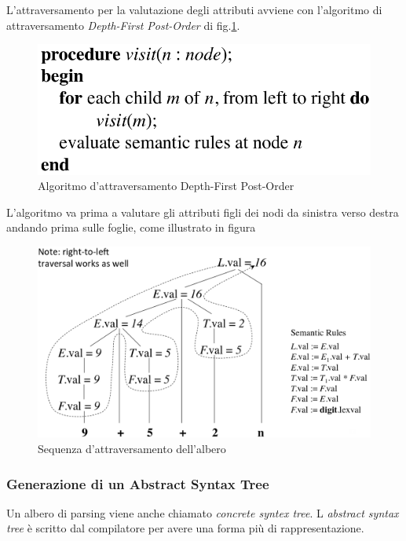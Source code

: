 L'attraversamento per la valutazione degli attributi avviene con l'algoritmo di
attraversamento \textit{Depth-First Post-Order} di
fig.\ref{img:traversal_algorithm}.
\begin{figure}[H]
  \centering
  \includegraphics[scale=0.4]{res/image/traversal_algorithm}
  \caption{Algoritmo d'attraversamento Depth-First Post-Order}
  \label{img:traversal_algorithm}
\end{figure}

L'algoritmo va prima a valutare gli attributi figli dei nodi da sinistra verso
destra andando prima sulle foglie, come illustrato in figura

\begin{figure}[H]
  \centering
  \includegraphics[scale=0.35]{res/image/traversal_tree}
  \caption{Sequenza d'attraversamento dell'albero}
  \label{img:traversal_tree}
\end{figure}

\subsubsection{Generazione di un Abstract Syntax Tree}
Un albero di parsing viene anche chiamato \textit{concrete syntex tree}. L
\textit{abstract syntax tree} \`e scritto dal compilatore per avere una forma
pi\`u di rappresentazione.

